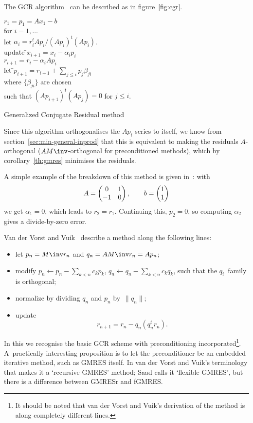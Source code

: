 \documentclass[11pt]{artikel3}
\begin{document}
\begin{Outline}
The GCR algorithm~\cite{Elman:thesis} can be described as 
in figure~\ref{fig:cgr}.
\begin{rfigure}
\begin{tabbing}
$r_1=p_1=Ax_1-b$\\
for \=$i=1,\ldots$\\
\>let $\alpha_i=r_i^tAp_i/(Ap_i)^t(Ap_i)$.\\
\>update \=$x_{i+1}=x_i-\alpha_ip_i$\\
\>\>$r_{i+1}=r_i-\alpha_iAp_i$\\
\>let \=$p_{i+1}=r_{i+1}+\sum_{j\leq i}p_j\beta_{ji}$\\
\>\>where $\{\beta_{ji}\}$ are chosen\\
\>\>such that $(Ap_{i+1})^t(Ap_j)=0$ for $j\leq i$.
\end{tabbing}
\caption{Generalized Conjugate Residual method}\label{fig:cgr}
\end{rfigure}
Since this algorithm orthogonalises the $Ap_i$ series to itself,
we know from section~\ref{sec:min-general-inprod}
that this is equivalent to making the residuals $A$-orthogonal
($AM\inv$-orthogonal for preconditioned methods),
which by corollary~\ref{th:gmres} minimises the residuals.

A simple example of the breakdown of this method is given in~\cite{SaadSchultz:gmres}:
with \[ A=\begin{pmatrix}0&1\cr -1&0\end{pmatrix},\qquad b=\begin{pmatrix}1\cr 1\end{pmatrix} \]
we get $\alpha_1=0$, which leads to $r_2=r_1$.
Continuing this, $p_2=0$, so computing $\alpha_2$ gives a 
divide-by-zero error.

Van der Vorst and Vuik~\cite{VoVuik:gmresr}
describe a method along the following lines:
\begin{itemize}
\item let $p_n=M\inv r_n$ and $q_n=AM\inv r_n=Ap_n$;
\item modify $p_n\leftarrow p_n-\sum_{k<n}c_kp_k$,
$q_n\leftarrow q_n-\sum_{k<n}c_kq_k$, such that the $q_i$~family
is orthogonal;
\item normalize by dividing $q_n$ and $p_n$ by~$\|q_n\|$;
\item update \[ r_{n+1}=r_n-q_n (q_n^tr_n). \]
\end{itemize}
In this we recognise the basic GCR scheme with preconditioning
incorporated\footnote{It should be noted that van der Vorst and Vuik's
derivation of the method is along completely different
lines.}. A~practically interesting proposition is to let the
preconditioner be an embedded iterative method, such as GMRES
itself. In van der Vorst and Vuik's terminology that makes it a
`recursive GMRES' method; Saad calls it `flexible GMRES', but there is
a difference between GMRESr and fGMRES.


\end{Outline}
\end{document}
